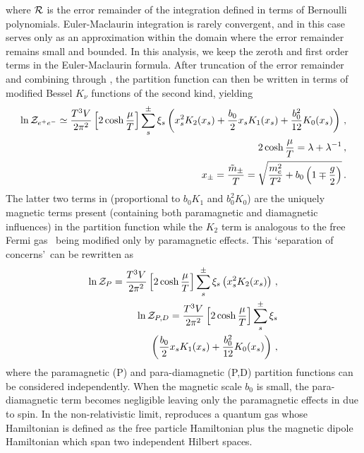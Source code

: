 where ${\cal R}$ is the error remainder of the integration defined in terms of Bernoulli polynomials. Euler-Maclaurin integration is rarely convergent, and in this case serves only as an approximation within the domain where the error remainder remains small and bounded. In this analysis, we keep the zeroth and first order terms in the Euler-Maclaurin formula. After truncation of the error remainder and combining  through , the partition function can then be written in terms of modified Bessel $K_{\nu}$ functions of the second kind, yielding
\begin{align}
 \label{boltzmann}
 \ln{\cal Z}_{e^{+}e^{-}}\simeq\frac{T^{3}V}{2\pi^{2}}\left[2\cosh{\frac{\mu}{T}}\right]\sum_{s}^{\pm}\xi_{s}
 \left(x_{s}^{2}K_{2}(x_{s})+\frac{b_{0}}{2}x_{s}K_{1}(x_{s})+\frac{b_{0}^{2}}{12}K_{0}(x_{s})\right)\,,\\
 \label{xfunc}
 2\cosh{\frac{\mu}{T}}=\lambda+\lambda^{-1}\,,\\
 x_{\pm}=\frac{{\tilde m}_{\pm}}{T}=\sqrt{\frac{m_{e}^{2}}{T^{2}}+b_{0}\left(1\mp\frac{g}{2}\right)}\,.
\end{align}
The latter two terms in  (proportional to $b_{0}K_{1}$ and $b_{0}^{2}K_{0}$) are the uniquely magnetic terms present (containing both paramagnetic and diamagnetic influences) in the partition function while the $K_{2}$ term is analogous to the free Fermi gas~\cite{greiner2012thermodynamics} being modified only by paramagnetic effects. This \lq separation of concerns\rq\ can be rewritten as
\begin{align}
 \label{para}
 \ln{\cal Z}_{P}=\frac{T^{3}V}{2\pi^{2}}\left[2\cosh{\frac{\mu}{T}}\right]\sum_{s}^{\pm}\xi_{s}\left(x_{s}^{2}K_{2}(x_{s})\right)\,,\\
 \label{paradia}
 \ln{\cal Z}_{P,D}=\frac{T^{3}V}{2\pi^{2}}\left[2\cosh{\frac{\mu}{T}}\right]\sum_{s}^{\pm}\xi_{s}\\
 \left(\frac{b_{0}}{2}x_{s}K_{1}(x_{s})+\frac{b_{0}^{2}}{12}K_{0}(x_{s})\right)\,,
\end{align}
where the paramagnetic (P) and para-diamagnetic (P,D) partition functions can be considered independently. When the magnetic scale $b_{0}$ is small, the para-diamagnetic term  becomes negligible leaving only the paramagnetic effects in  due to spin. In the non-relativistic limit,  reproduces a quantum gas whose Hamiltonian is defined as the free particle Hamiltonian plus the magnetic dipole Hamiltonian which span two independent Hilbert spaces.


